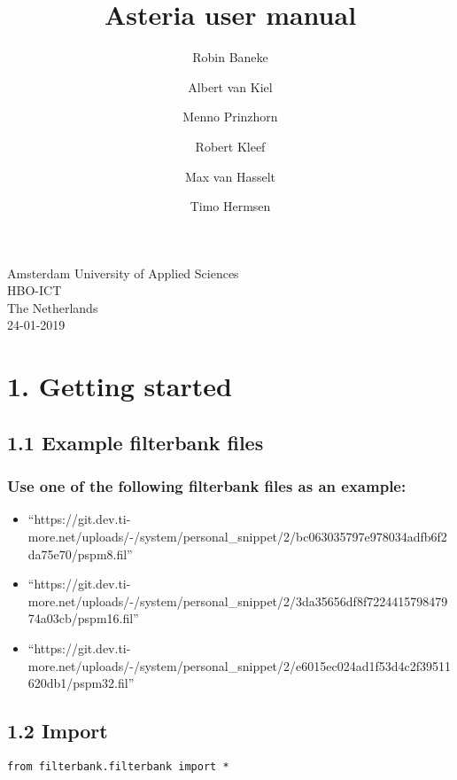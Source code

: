 \documentclass[]{article}
\title{Asteria user manual}
\author{Robin Baneke \and Albert van Kiel \and Menno Prinzhorn \and Robert Kleef \and Max van Hasselt \and Timo Hermsen}
\date{}
\providecommand{\tightlist}{%
  \setlength{\itemsep}{0pt}\setlength{\parskip}{0pt}}
\begin{document}
	\begin{titlepage}

			\maketitle
			
			\vspace{0.8cm}
		\begin{center}
			Amsterdam University of Applied Sciences\\
			HBO-ICT\\
			The Netherlands\\
			24-01-2019
		\end{center}
	\end{titlepage}

\section{1. Getting started}\label{getting-started}

\subsection{1.1 Example filterbank
files}\label{example-filterbank-files}

\subsubsection{Use one of the following filterbank files as an
example:}\label{use-one-of-the-following-filterbank-files-as-an-example}

\begin{itemize}
\tightlist
\item
  ``https://git.dev.ti-more.net/uploads/-/system/personal\_snippet/2/bc063035797e978034adfb6f2da75e70/pspm8.fil''
\item
  ``https://git.dev.ti-more.net/uploads/-/system/personal\_snippet/2/3da35656df8f722441579847974a03cb/pspm16.fil''
\item
  ``https://git.dev.ti-more.net/uploads/-/system/personal\_snippet/2/e6015ec024ad1f53d4c2f39511620db1/pspm32.fil''
\end{itemize}

\subsection{1.2 Import}\label{import}

\begin{verbatim}
from filterbank.filterbank import *
\end{verbatim}
\end{document}
